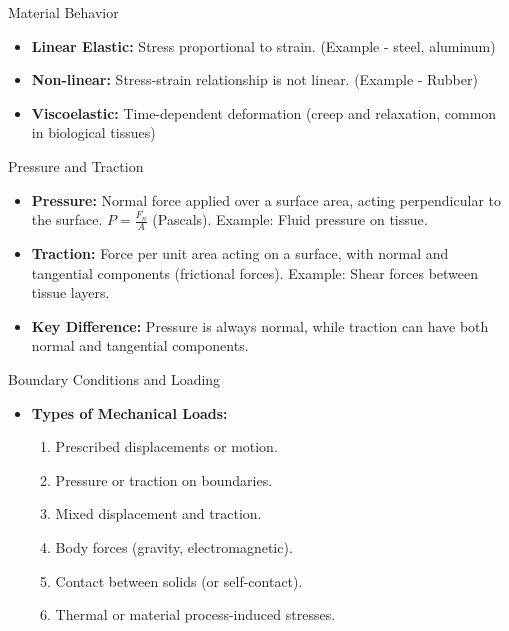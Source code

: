 \documentclass{beamer}
\begin{document}
\begin{frame}{Material Behavior}
  \begin{itemize}
    \item \textbf{Linear Elastic:} Stress proportional to strain. (Example - steel, aluminum)
    \item \textbf{Non-linear:} Stress-strain relationship is not linear. (Example - Rubber)
    \item \textbf{Viscoelastic:} Time-dependent deformation (creep and relaxation, common in biological tissues)
  \end{itemize}
\end{frame}

\begin{frame}{Pressure and Traction}
  \begin{itemize}
    \item \textbf{Pressure:} Normal force applied over a surface area, acting perpendicular to the surface. $P = \frac{F_n}{A}$ (Pascals). Example: Fluid pressure on tissue.
    \item \textbf{Traction:} Force per unit area acting on a surface, with normal and tangential components (frictional forces). Example: Shear forces between tissue layers.
    \item \textbf{Key Difference:} Pressure is always normal, while traction can have both normal and tangential components.
  \end{itemize}
\end{frame}

\begin{frame}{Boundary Conditions and Loading}
  \begin{itemize}
    \item \textbf{Types of Mechanical Loads:}
      \begin{enumerate}
        \item Prescribed displacements or motion.
        \item Pressure or traction on boundaries.
        \item Mixed displacement and traction.
        \item Body forces (gravity, electromagnetic).
        \item Contact between solids (or self-contact).
        \item Thermal or material process-induced stresses.
      \end{enumerate}
  \end{itemize}
\end{frame}
\end{document}
